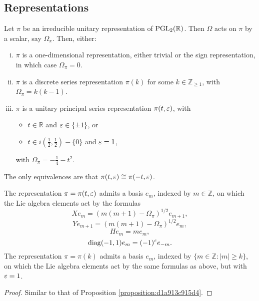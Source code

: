 \documentclass[reqno]{amsart} 
\numberwithin{equation}{section}
\begin{document}
\subsection{Representations}\label{sec:d1a915c57e2f}

\begin{proposition}
  Let $\pi$ be an irreducible unitary representation of $\operatorname{PGL}_2(\mathbb{R})$.  Then $\Omega$ acts on $\pi$ by a scalar, say $\Omega_\pi$.  Then, either:
  \begin{enumerate}[(i)]
  \item $\pi$ is a one-dimensional representation, either trivial or the sign representation, in which case $\Omega_\pi = 0$.
  \item  $\pi$ is a discrete series representation $\pi(k)$ for some $k \in \mathbb{Z}_{\geq 1}$, with $\Omega_\pi = k(k-1)$.
  \item $\pi$ is a unitary principal series representation $\pi(t,\varepsilon)$, with
    \begin{itemize}
    \item$t \in \mathbb{R}$ and $\varepsilon \in \{\pm 1\}$, or
    \item $t \in i (\tfrac{1}{2}, \tfrac{1}{2} ) - \{0\}$ and $\varepsilon = 1$, 
    \end{itemize}
    with $\Omega_\pi = - \tfrac{1}{4} - t^2$.
  \end{enumerate}
  The only equivalences are that $\pi(t,\varepsilon) \cong \pi(-t,\varepsilon)$.

  The representation $\pi = \pi(t,\varepsilon)$ admits a basis $e_m$, indexed by $m \in \mathbb{Z}$, on which the Lie algebra elements act by the formulas
  \begin{equation*}
    X e_m = ( m(m+1) - \Omega_\pi)^{1/2} e_{m+1},
  \end{equation*}
  \begin{equation*}
    Y e_{m+1} = (m(m+1) - \Omega_\pi)^{1/2} e_{m},
  \end{equation*}
  \begin{equation*}
    H e_m = m e_m,
\end{equation*}
\begin{equation*}
    \operatorname{diag}(-1,1) e_m = (-1)^{\varepsilon} e_{-m}.
  \end{equation*}
  The representation $\pi = \pi(k)$ admits a basis $e_m$, indexed by $\{m \in \mathbb{Z} : |m| \geq k\}$, on which the Lie algebra elements act by the same formulas as above, but with $\varepsilon = 1$.  
\end{proposition}
\begin{proof}
Similar to that of Proposition \ref{proposition:d1a913c915d4}.
\end{proof}
\end{document}
